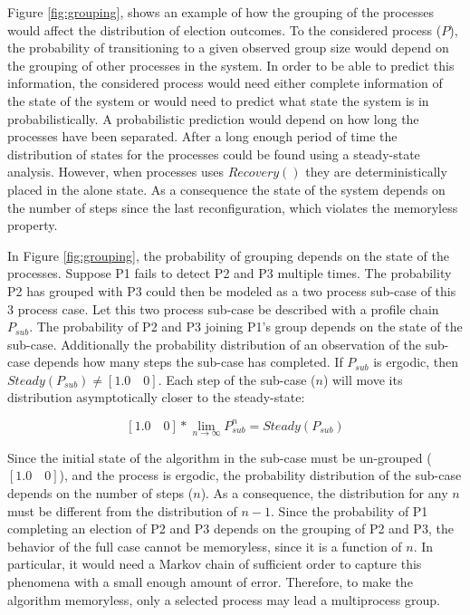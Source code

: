 Figure \ref{fig:grouping}, shows an example of how the grouping of the processes would affect the distribution of election outcomes.
To the considered process ($P$), the probability of transitioning to a given observed group size would depend on the grouping of other processes in the system.
In order to be able to predict this information, the considered process would need either complete information of the state of the system or would need to predict what state the system is in probabilistically.
A probabilistic prediction would depend on how long the processes have been separated.
After a long enough period of time the distribution of states for the processes could be found using a steady-state analysis.
However, when processes uses $Recovery()$ they are deterministically placed in the alone state.
As a consequence the state of the system depends on the number of steps since the last reconfiguration, which violates the memoryless property.

In Figure \ref{fig:grouping}, the probability of grouping depends on the state of the processes.
Suppose P1 fails to detect P2 and P3 multiple times.
The probability P2 has grouped with P3 could then be modeled as a two process sub-case of this 3 process case.
Let this two process sub-case be described with a profile chain $P_{sub}$.
The probability of P2 and P3 joining P1's group depends on the state of the sub-case.
Additionally the probability distribution of an observation of the sub-case depends how many steps the sub-case has completed.
If $P_{sub}$ is ergodic, then $Steady(P_{sub}{}) \neq [1.0 \quad 0]$.
Each step of the sub-case ($n$) will move its distribution asymptotically closer to the steady-state:
 
\[ [1.0 \quad 0] * \lim_{n \to \infty}P_{sub}^n = Steady(P_{sub}) \]  

Since the initial state of the algorithm in the sub-case must be un-grouped ($[1.0 \quad 0]$), and the process is ergodic, the probability distribution of the sub-case depends on the number of steps ($n$).
As a consequence, the distribution for any $n$ must be different from the distribution of $n-1$. 
Since the probability of P1 completing an election of P2 and P3 depends on the grouping of P2 and P3, the behavior of the full case cannot be memoryless, since it is a function of $n$.
In particular, it would need a Markov chain of sufficient order to capture this phenomena with a small enough amount of error.
Therefore, to make the algorithm memoryless, only a selected process may lead a multiprocess group.

